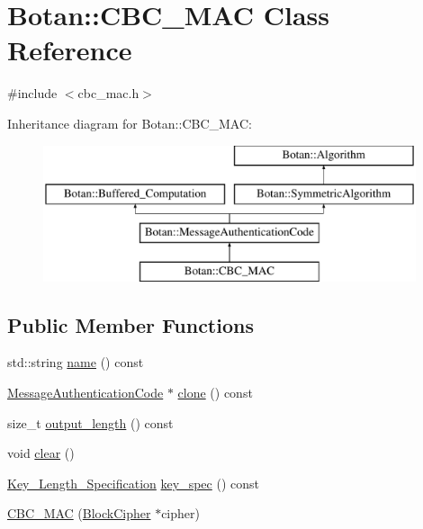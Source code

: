 \hypertarget{classBotan_1_1CBC__MAC}{\section{Botan\-:\-:C\-B\-C\-\_\-\-M\-A\-C Class Reference}
\label{classBotan_1_1CBC__MAC}
}


{\ttfamily \#include $<$cbc\-\_\-mac.\-h$>$}

Inheritance diagram for Botan\-:\-:C\-B\-C\-\_\-\-M\-A\-C\-:\begin{figure}[H]
\begin{center}
\leavevmode
\includegraphics[height=4.000000cm]{classBotan_1_1CBC__MAC}
\end{center}
\end{figure}
\subsection*{Public Member Functions}
\begin{DoxyCompactItemize}
\item 
std\-::string \hyperlink{classBotan_1_1CBC__MAC_ac81c88175ee94ce6c8f10f0a18a5be21}{name} () const 
\item 
\hyperlink{classBotan_1_1MessageAuthenticationCode}{Message\-Authentication\-Code} $\ast$ \hyperlink{classBotan_1_1CBC__MAC_a6b9a12f092faf4d3639c96c20efe57c7}{clone} () const 
\item 
size\-\_\-t \hyperlink{classBotan_1_1CBC__MAC_aa272af383a4166632e4fc7fa35f8aea8}{output\-\_\-length} () const 
\item 
void \hyperlink{classBotan_1_1CBC__MAC_a831686904488a0da53e27c11e52abf69}{clear} ()
\item 
\hyperlink{classBotan_1_1Key__Length__Specification}{Key\-\_\-\-Length\-\_\-\-Specification} \hyperlink{classBotan_1_1CBC__MAC_a20e1e544487a59a53e22bf822a0c42f9}{key\-\_\-spec} () const 
\item 
\hyperlink{classBotan_1_1CBC__MAC_a5ee7533af808fe8c693fe2c1c1f6e740}{C\-B\-C\-\_\-\-M\-A\-C} (\hyperlink{classBotan_1_1BlockCipher}{Block\-Cipher} $\ast$cipher)
\end{DoxyCompactItemize}


